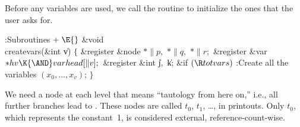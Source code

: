 Before any variables are used, we call the  routine
to initialize the ones that the user asks for.

\Y\B\4:Subroutines\X${}\mathrel+\E{}$\6
\&{void} \\{createvars}(\&{int} \|v)\1\1\2\2\6
${}\{{}$\1\6
\&{register} \&{node} ${}{*}\|p,{}$ ${}{*}\|q,{}$ ${}{*}\|r;{}$\6
\&{register} \&{var} ${}{*}\\{hv}\K{\AND}\\{varhead}[\|v];{}$\6
\&{register} \&{int} \|j${},{}$ \|k;\7
\&{if} ${}(\R\\{totvars}){}$\1\5
:Create all the variables $(x_0,\ldots,x_v)$\X;\2\6
\4${}\}{}$\2\par
\fi

We need a node at each level that means ``tautology from
here on,''
i.e., all further branches lead to . These nodes are called
$t_0$, $t_1$, \dots, in printouts. Only $t_0$, which represents the
constant~1, is considered external, reference-count-wise.

